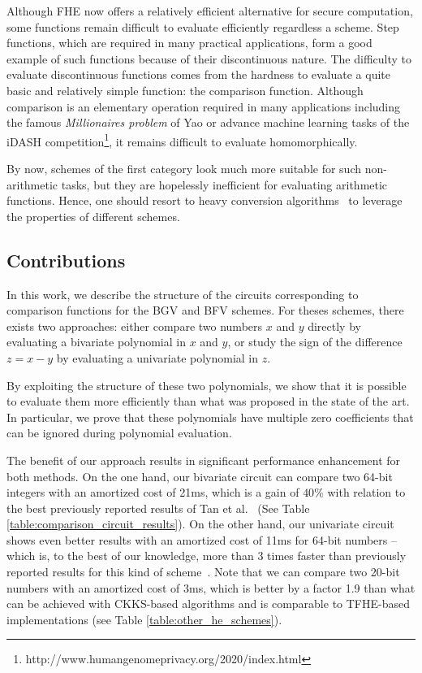 Although \ac{FHE} now offers a relatively efficient alternative for secure computation, some functions remain difficult to evaluate efficiently regardless a scheme. 
Step functions, which are required in many practical applications, form a good example of such functions because of their discontinuous nature. 
The difficulty to evaluate discontinuous functions comes from the hardness to evaluate a quite basic and relatively simple function: the comparison function. 
Although comparison is an elementary operation required in many applications including the famous \emph{Millionaires problem} of Yao \cite{Yao82} or advance machine learning tasks of the iDASH competition\footnote{http://www.humangenomeprivacy.org/2020/index.html}, it remains difficult to evaluate homomorphically.

By now, schemes of the first category look much more suitable for such non-arithmetic tasks, but they are hopelessly inefficient for evaluating arithmetic functions.
Hence, one should resort to heavy conversion algorithms~\cite{JMC:BGGJ20} to leverage the properties of different schemes. 

\subsection{Contributions}
In this work, we describe the structure of the circuits corresponding to comparison functions for the BGV and BFV schemes. 
For theses schemes, there exists two approaches: either compare two numbers $x$ and $y$ directly by evaluating a bivariate polynomial in $x$ and $y$, or study the sign of the difference $z=x-y$ by evaluating a univariate polynomial in $z$.

By exploiting the structure of these two polynomials, we show that it is possible to evaluate them more efficiently than what was proposed in the state of the art.
In particular, we prove that these polynomials have multiple zero coefficients that can be ignored during polynomial evaluation.

The benefit of our approach results in significant performance enhancement for both methods. 
On the one hand, our bivariate circuit can compare two 64-bit integers with an amortized cost of 21ms, which is a gain of $40\%$ with relation to the best previously reported results of Tan et al.~\cite{TLWRK20} (See Table \ref{table:comparison_circuit_results}). 
On the other hand, our univariate circuit shows even better results with an amortized cost of 11ms for 64-bit numbers -- which is, to the best of our knowledge, more than 3 times faster than previously reported results for this kind of scheme~\cite{TLWRK20}. 
Note that we can compare two 20-bit numbers with an amortized cost of 3ms, which is better by a factor 1.9 than what can be achieved with CKKS-based algorithms and is comparable to TFHE-based implementations (see Table \ref{table:other_he_schemes}).

